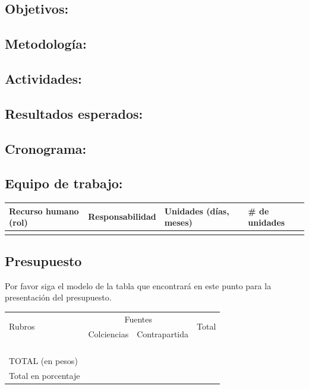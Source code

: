 
\subsection{Objetivos:                                     }
\subsection{Metodología:                                   }
\subsection{Actividades:                                   }
\subsection{Resultados esperados:                          }
\subsection{Cronograma:                                    }

\subsection{Equipo de trabajo:}
\begin{tabular}{|l|l|l|l|}\hline
Recurso humano (rol)& Responsabilidad& Unidades (días, meses)& \# de unidades\\\hline
&&&\\\hline
\end{tabular}

\subsection{Presupuesto}
\begin{instrucciones}
  Por favor siga el modelo de la tabla que encontrará en este punto para la presentación del presupuesto.
\end{instrucciones}
\begin{tabular}{|l|l|l|l|}\hline
  \multirow{2}{*}{Rubros}&\multicolumn{2}{c}{Fuentes}\vline&\multirow{2}{*}{Total}\\
  \cline{2-3} & Colciencias & Contrapartida & \\\hline 
 & & &\\\hline
 & & &\\\hline
 & & &\\\hline
 & & &\\\hline
TOTAL (en pesos) & & &\\\hline
Total en porcentaje & & &\\\hline
\end{tabular}

